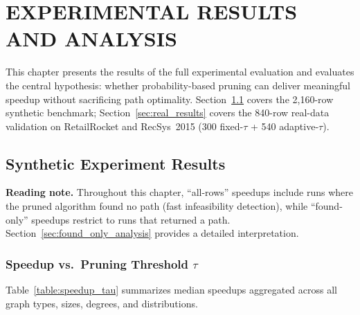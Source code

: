 \chapter{EXPERIMENTAL RESULTS AND ANALYSIS}\label{chap:results}

This chapter presents the results of the full experimental evaluation and evaluates the central hypothesis: whether probability-based pruning can deliver meaningful speedup without sacrificing path optimality. Section~\ref{sec:synth_results} covers the 2,160-row synthetic benchmark; Section~\ref{sec:real_results} covers the 840-row real-data validation on RetailRocket and RecSys~2015 (300 fixed-$\tau$ + 540 adaptive-$\tau$).

\section{Synthetic Experiment Results}\label{sec:synth_results}

\begin{sloppypar}
\noindent\textbf{Reading note.} Throughout this chapter, ``all-rows'' speedups include runs where the pruned algorithm found no path (fast infeasibility detection), while ``found-only'' speedups restrict to runs that returned a path. Section~\ref{sec:found_only_analysis} provides a detailed interpretation.
\end{sloppypar}

\subsection{Speedup vs.\ Pruning Threshold \texorpdfstring{$\tau$}{tau}}\label{sec:speedup_vs_tau}

Table~\ref{table:speedup_tau} summarizes median speedups aggregated across all graph types, sizes, degrees, and distributions.

